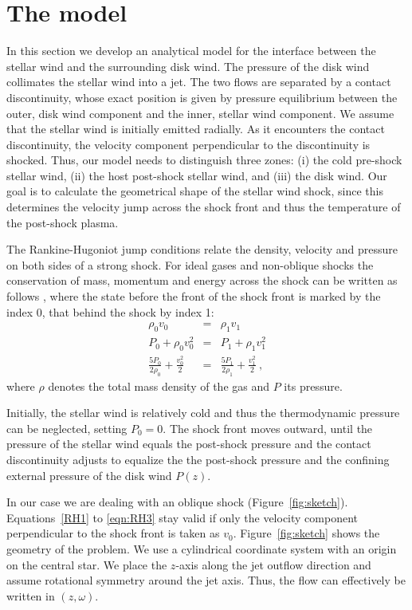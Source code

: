 \section{The model}

In this section we develop an analytical model for the interface between the stellar wind and the surrounding disk wind. The pressure of the disk wind collimates the stellar wind into a jet. The two flows are separated by a contact discontinuity, whose exact position is given by pressure equilibrium between the outer, disk wind component and the inner, stellar wind component. We assume that the stellar wind is initially emitted radially. As it encounters the contact discontinuity, the velocity component perpendicular to the discontinuity is shocked. Thus, our model needs to distinguish three zones: (i) the cold pre-shock stellar wind, (ii) the host post-shock stellar wind, and (iii) the disk wind. Our goal is to calculate the geometrical shape of the stellar wind shock, since this determines the velocity jump across the shock front and thus the temperature of the post-shock plasma. 

The Rankine-Hugoniot jump conditions relate the density, velocity and pressure on both sides of a strong shock. For ideal gases and non-oblique shocks the conservation of mass, momentum and energy across the shock can be written as follows \citep[][chap.~7, \S~15]{http://adsabs.harvard.edu/abs/1967pswh.book.....Z}, where the state before the front of the shock front is marked by the index 0, that behind the shock by index 1:
\begin{eqnarray}
\label{eqn:RH1}\rho_0 v_0 &=& \rho_1 v_1\\
\label{eqn:RH2}P_0+\rho_0 v_0^2 &=& P_1+\rho_1 v_1^2\\
\label{eqn:RH3}\frac{5 P_0}{2\rho_0}+\frac{v_0^2}{2}&=&\frac{5 P_1}{2\rho_1}+\frac{v_1^2}{2} \ ,
\end{eqnarray}
where $\rho$ denotes the total mass density of the gas and $P$ its pressure. 

Initially, the stellar wind is relatively cold and thus the thermodynamic pressure can be neglected, setting $P_0=0$.
The shock front moves outward, until the pressure of the stellar wind equals the post-shock pressure and the contact discontinuity adjusts to equalize the the post-shock pressure and the confining external pressure of the disk wind $P(z)$. 

In our case we are dealing with an oblique shock (Figure~\ref{fig:sketch}). Equations~\ref{RH1} to \ref{eqn:RH3} stay valid if only the velocity component perpendicular to the shock front is taken as $v_0$. 
Figure~\ref{fig:sketch} shows the geometry of the problem. We use a cylindrical coordinate system with an origin on the central star. We place the $z$-axis along the jet outflow direction and assume rotational symmetry around the jet axis. Thus, the flow can effectively be written in $(z,\omega)$. 

